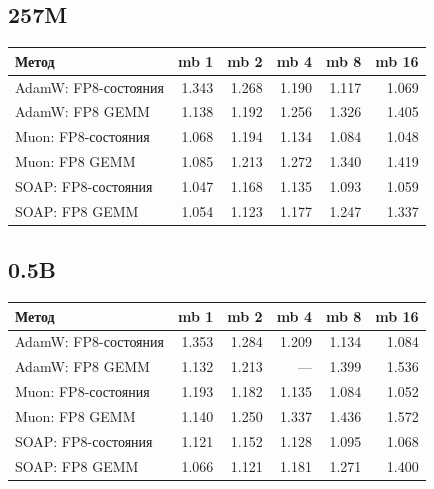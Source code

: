 \documentclass[10pt]{article}
\begin{document}
\subsection{257M}
\begin{center}
\small
\begin{tabular}{lrrrrr}
\toprule
\textbf{Метод} & \textbf{mb 1} & \textbf{mb 2} & \textbf{mb 4} & \textbf{mb 8} & \textbf{mb 16} \\
\midrule
AdamW: FP8-состояния & 1.343 & 1.268 & 1.190 & 1.117 & 1.069 \\
AdamW: FP8 GEMM & 1.138 & 1.192 & 1.256 & 1.326 & 1.405 \\
Muon: FP8-состояния & 1.068 & 1.194 & 1.134 & 1.084 & 1.048 \\
Muon: FP8 GEMM & 1.085 & 1.213 & 1.272 & 1.340 & 1.419 \\
SOAP: FP8-состояния & 1.047 & 1.168 & 1.135 & 1.093 & 1.059 \\
SOAP: FP8 GEMM & 1.054 & 1.123 & 1.177 & 1.247 & 1.337 \\
\bottomrule
\end{tabular}
\end{center}
\subsection{0.5B}
\begin{center}
\small
\begin{tabular}{lrrrrr}
\toprule
\textbf{Метод} & \textbf{mb 1} & \textbf{mb 2} & \textbf{mb 4} & \textbf{mb 8} & \textbf{mb 16} \\
\midrule
AdamW: FP8-состояния & 1.353 & 1.284 & 1.209 & 1.134 & 1.084 \\
AdamW: FP8 GEMM & 1.132 & 1.213 & --- & 1.399 & 1.536 \\
Muon: FP8-состояния & 1.193 & 1.182 & 1.135 & 1.084 & 1.052 \\
Muon: FP8 GEMM & 1.140 & 1.250 & 1.337 & 1.436 & 1.572 \\
SOAP: FP8-состояния & 1.121 & 1.152 & 1.128 & 1.095 & 1.068 \\
SOAP: FP8 GEMM & 1.066 & 1.121 & 1.181 & 1.271 & 1.400 \\
\bottomrule
\end{tabular}
\end{center}
\end{document}
